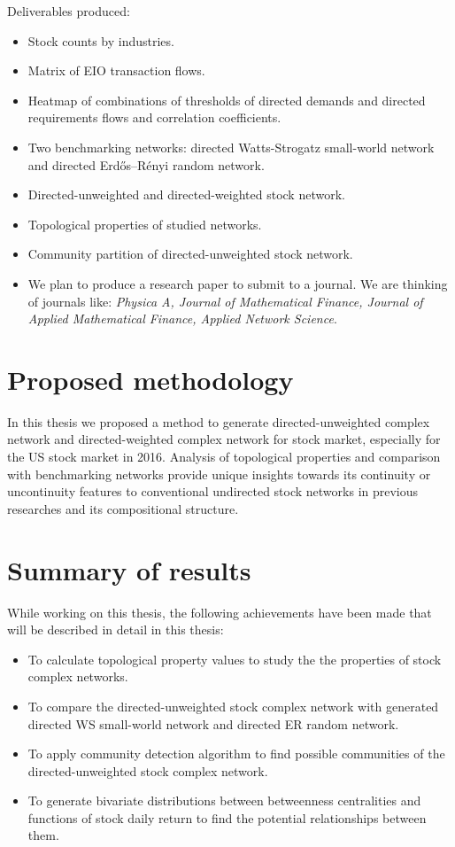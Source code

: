\vline

Deliverables produced:

\begin{itemize}
	\item Stock counts by industries.
	\item Matrix of EIO transaction flows.
	\item Heatmap of combinations of thresholds of directed demands and directed requirements flows and correlation coefficients.
	\item Two benchmarking networks: directed Watts-Strogatz small-world network and directed Erdős–Rényi random network.
	\item Directed-unweighted and directed-weighted stock network.
	\item Topological properties of studied networks.
	\item Community partition of directed-unweighted stock network.
	\item We plan to produce a research paper to submit to a journal. We are thinking of journals like:  \textit{Physica A, Journal of Mathematical Finance, Journal of Applied Mathematical Finance, Applied Network Science}.
\end{itemize}

\section{Proposed methodology}


In this thesis we proposed a method to generate directed-unweighted complex network and directed-weighted complex network for stock market, especially for the US stock market in 2016. Analysis of topological properties and comparison with benchmarking networks provide unique insights towards its continuity or uncontinuity features to conventional undirected stock networks in previous researches and its compositional structure.

\section{Summary of results}
While working on this thesis, the following achievements have been made that will be described in detail in this thesis:

\begin{itemize}
	\item To calculate topological property values to study the the properties of stock complex networks.
	\item To compare the directed-unweighted stock complex network with generated directed WS small-world network and directed ER random network.
	\item To apply community detection algorithm to find possible communities of the directed-unweighted stock complex network.
	\item To generate bivariate distributions between betweenness centralities and functions of stock daily return to find the potential relationships between them.
\end{itemize}

